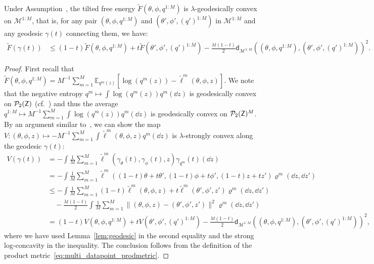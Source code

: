 \begin{lemma}\label{lem:geodesic_convexity}
    Under Assumption~, the tilted free energy $\tilde{F}(\theta, \phi, q^{1:M})$ is $\lambda$-geodesically convex on $\mathcal{M}^{1:M}$, that is, for any pair $(\theta, \phi, q^{1:M})$ and $(\theta', \phi', (q')^{1:M})$ in $\mathcal{M}^{1:M}$ and any geodesic $\gamma(t)$ connecting them, we have:
    \begin{align*}
        \tilde{F}(\gamma(t)) &\leq (1-t)\tilde{F}(\theta, \phi, q^{1:M}) + t\tilde{F}(\theta', \phi', (q')^{1:M}) 
        - \frac{\lambda t(1-t)}{2}\mathsf{d}_{\mathcal{M}^{1:M}}((\theta, \phi, q^{1:M}), (\theta', \phi', (q')^{1:M}))^2.
    \end{align*}
\end{lemma}
\begin{proof}
    First recall that $\tilde{F}(\theta, \phi, q^{1:M})= M^{-1} \sum_{m=1}^M \mathbb{E}_{q^m(z)}[\log(q^m(z))-\tilde{\ell}^m(\theta,\phi,z)]$.
    We note that the negative entropy $q^m \mapsto \int \log(q^m(z)) q^m(\dd z)$ is geodesically convex on $\mathcal{P}_2({\mathsf{Z}})$ (cf.~\citet[Theorem 7.28]{santambrogio2015optimal}) and thus the average $q^{1:M} \mapsto M^{-1}\sum_{m=1}^M \int \log(q^m(z)) q^m(\dd z)$ is geodesically convex on $\mathcal{P}_2({\mathsf{Z}})^M$. By an argument similar to~\citet[Lemma 21]{caprioerrorboundsparticle2024}, we can show the map $V: (\theta, \phi, z) \mapsto -M^{-1}\sum_{m=1}^M \int \tilde{\ell}^m(\theta,\phi, z) q^m(\dd z)$ is $\lambda$-strongly convex along the geodesic $\gamma(t)$:
    \begin{align*}
        V(\gamma(t)) &= - \int \frac{1}{M}\sum_{m=1}^{M} \tilde{\ell}^m(\gamma_\theta(t), \gamma_\phi(t), z) \gamma_{q^m}(t)(\dd z) \\
        &=-\int \frac{1}{M}\sum_{m=1}^{M} \tilde{\ell}^m((1-t)\theta + t\theta', (1-t)\phi + t\phi', (1-t)z + tz') \varrho^m(\dd z, \dd z') \\
        &\leq -\int \frac{1}{M}\sum_{m=1}^{M} (1-t) \tilde{\ell}^m(\theta, \phi, z) + t\tilde{\ell}^m(\theta', \phi', z') \varrho^m(\dd z, \dd z') \\
        &\quad - \frac{\lambda t(1-t)}{2} \int \frac{1}{M}\sum_{m=1}^M \|(\theta, \phi, z) - (\theta', \phi', z')\|^2 \varrho^m(\dd z, \dd z') \\
        &=(1-t)V(\theta, \phi, q^{1:M}) + tV(\theta', \phi', (q')^{1:M}) - \frac{\lambda t(1-t)}{2} \mathsf{d}_{\mathcal{M}^{1:M}}((\theta, \phi, q^{1:M}), (\theta', \phi', (q')^{1:M}))^2,
    \end{align*}
    where we have used Lemma~\ref{lem:geodesic} in the second equality and the strong log-concavity in the inequality. The conclusion follows from the definition of the product metric~\eqref{eq:multi_datapoint_prodmetric}.
\end{proof}
